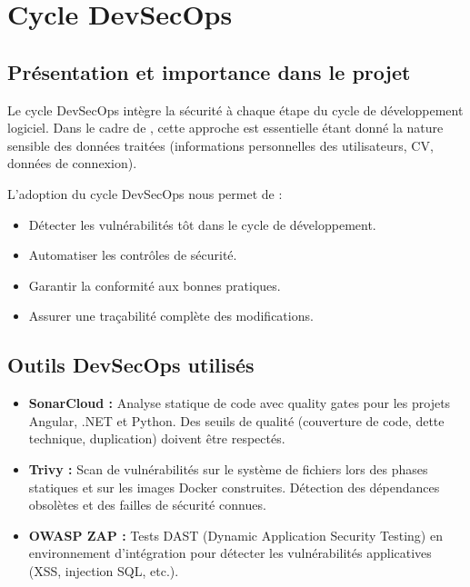 \section{Cycle DevSecOps}
\label{sec:realisation:devsecops}

\subsection{Présentation et importance dans le projet}
\label{subsec:realisation:devsecops-presentation}

Le cycle DevSecOps intègre la sécurité à chaque étape du cycle de développement logiciel. Dans le cadre de \projectname{}, cette approche est essentielle étant donné la nature sensible des données traitées (informations personnelles des utilisateurs, CV, données de connexion).

L'adoption du cycle DevSecOps nous permet de :
\begin{itemize}
    \item Détecter les vulnérabilités tôt dans le cycle de développement.
    \item Automatiser les contrôles de sécurité.
    \item Garantir la conformité aux bonnes pratiques.
    \item Assurer une traçabilité complète des modifications.
\end{itemize}

\subsection{Outils DevSecOps utilisés}
\label{subsec:realisation:devsecops-outils}

\begin{itemize}
    \item \textbf{SonarCloud :} Analyse statique de code avec quality gates pour les projets Angular, .NET et Python. Des seuils de qualité (couverture de code, dette technique, duplication) doivent être respectés.
    \item \textbf{Trivy :} Scan de vulnérabilités sur le système de fichiers lors des phases statiques et sur les images Docker construites. Détection des dépendances obsolètes et des failles de sécurité connues.
    \item \textbf{OWASP ZAP :} Tests DAST (Dynamic Application Security Testing) en environnement d'intégration pour détecter les vulnérabilités applicatives (XSS, injection SQL, etc.).
\end{itemize}

